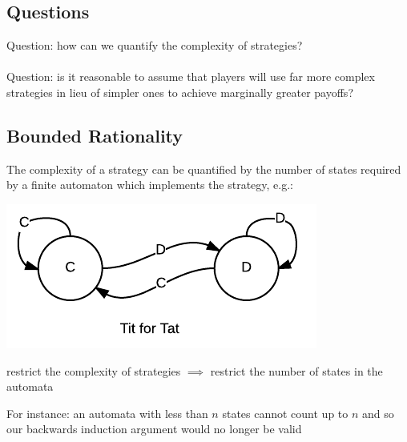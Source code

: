 \documentclass{article}
\begin{document}
\subsection{Questions}

\noindent Question: how can we quantify the complexity of strategies?\\\\
\noindent Question: is it reasonable to assume that players will use far more complex strategies in lieu of simpler ones to achiev\textsl{}e marginally greater payoffs?

\newpage

\subsection{Bounded Rationality}

The complexity of a strategy can be quantified by the number of states required by a finite automaton which implements the strategy, e.g.:

\includegraphics[scale=0.5]{tit4tat}

\noindent restrict the complexity of strategies $\implies$ restrict the number of states in the automata\\\textsl{\textsl{}}

\noindent For instance: an automata with less than $n$ states cannot count up to $n$ and so our backwards induction argument would no longer be valid
\end{document}

